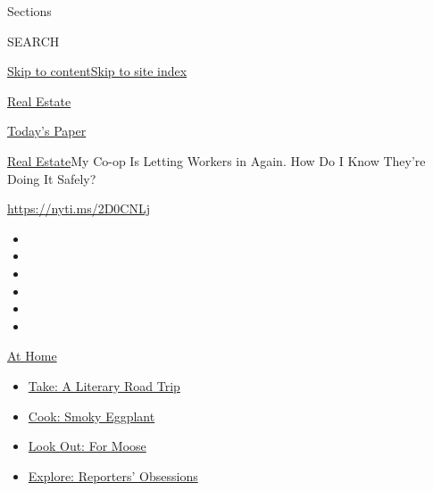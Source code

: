 Sections

SEARCH

\protect\hyperlink{site-content}{Skip to
content}\protect\hyperlink{site-index}{Skip to site index}

\href{https://www.nytimes.com/section/realestate}{Real Estate}

\href{https://myaccount.nytimes.com/auth/login?response_type=cookie\&client_id=vi}{}

\href{https://www.nytimes.com/section/todayspaper}{Today's Paper}

\href{/section/realestate}{Real Estate}\textbar{}My Co-op Is Letting
Workers in Again. How Do I Know They're Doing It Safely?

\url{https://nyti.ms/2D0CNLj}

\begin{itemize}
\item
\item
\item
\item
\item
\item
\end{itemize}

\href{https://www.nytimes.com/spotlight/at-home?action=click\&pgtype=Article\&state=default\&region=TOP_BANNER\&context=at_home_menu}{At
Home}

\begin{itemize}
\tightlist
\item
  \href{https://www.nytimes.com/2020/07/28/books/time-for-a-literary-road-trip.html?action=click\&pgtype=Article\&state=default\&region=TOP_BANNER\&context=at_home_menu}{Take:
  A Literary Road Trip}
\item
  \href{https://www.nytimes.com/2020/07/29/magazine/bored-with-your-home-cooking-some-smoky-eggplant-will-fix-that.html?action=click\&pgtype=Article\&state=default\&region=TOP_BANNER\&context=at_home_menu}{Cook:
  Smoky Eggplant}
\item
  \href{https://www.nytimes.com/2020/07/27/travel/moose-michigan-isle-royale.html?action=click\&pgtype=Article\&state=default\&region=TOP_BANNER\&context=at_home_menu}{Look
  Out: For Moose}
\item
  \href{https://www.nytimes.com/interactive/2020/at-home/even-more-reporters-editors-diaries-lists-recommendations.html?action=click\&pgtype=Article\&state=default\&region=TOP_BANNER\&context=at_home_menu}{Explore:
  Reporters' Obsessions}
\end{itemize}

